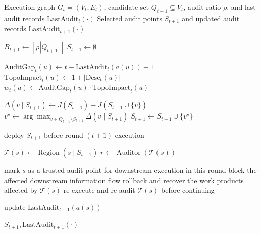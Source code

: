 \documentclass[letterpaper]{article} %
\begin{document}

\begin{algorithm}[t]
\caption{BRA: Exposure audit-point Scheduling}
\label{alg:bra_audit}
\begin{algorithmic}[1]
\REQUIRE Execution graph \(G_t=(V_t,E_t)\), candidate set
\(Q_{t+1}\subseteq V_t\), audit ratio \(\rho\), and last audit
records \(\mathrm{LastAudit}_t(\cdot)\)
\ENSURE Selected audit points \(S_{t+1}\) and updated audit
records \(\mathrm{LastAudit}_{t+1}(\cdot)\)

\STATE \(B_{t+1}\leftarrow
\left\lfloor \rho |Q_{t+1}| \right\rfloor\)
\STATE \(S_{t+1}\leftarrow \emptyset\)

    \STATE \(\mathrm{AuditGap}_t(u)
    \leftarrow t-\mathrm{LastAudit}_t(a(u))+1\)
    \STATE \(\mathrm{TopoImpact}_t(u)
    \leftarrow 1+|\mathrm{Desc}_t(u)|\)
    \STATE \(w_t(u)\leftarrow
    \mathrm{AuditGap}_t(u)\cdot
    \mathrm{TopoImpact}_t(u)\)
\ENDFOR

        \STATE \(\Delta(v\mid S_{t+1})
        \leftarrow J(S_{t+1})
        -J(S_{t+1}\cup\{v\})\)
    \ENDFOR
    \STATE \(v^\star\leftarrow
    \arg\max_{v\in Q_{t+1}\setminus S_{t+1}}
    \Delta(v\mid S_{t+1})\)
    \STATE \(S_{t+1}\leftarrow
    S_{t+1}\cup\{v^\star\}\)
\ENDWHILE

\STATE deploy \(S_{t+1}\) before round-\((t+1)\) execution

    \STATE \(\mathcal{T}(s)\leftarrow
    \operatorname{Region}(s\mid S_{t+1})\)
    \STATE \(r\leftarrow
    \operatorname{Auditor}(\mathcal{T}(s))\)

        \STATE mark \(s\) as a trusted audit point for
        downstream execution in this round
    \ELSE
        \STATE block the affected downstream information flow
        \STATE rollback and recover the work products
        affected by \(\mathcal{T}(s)\)
        \STATE re-execute and re-audit \(\mathcal{T}(s)\)
        before continuing
    \ENDIF

    \STATE update
    \(\mathrm{LastAudit}_{t+1}(a(s))\)
\ENDFOR

\RETURN \(S_{t+1},
\mathrm{LastAudit}_{t+1}(\cdot)\)
\end{algorithmic}
\end{algorithm}
\end{document}
